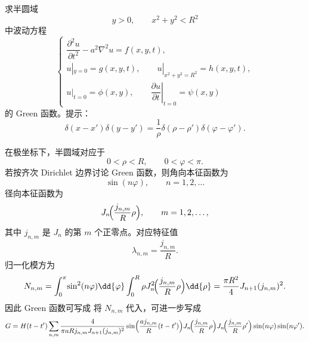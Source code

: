 \begin{question}

求半圆域
\[
 y>0,\qquad x^2+y^2<R^2
\]
中波动方程
\[
\begin{cases}
\dfrac{\partial^2u}{\partial t^2}-a^2\nabla^2u=f(x,y,t),\\
u|_{y=0}=g(x,y,t),\qquad u|_{x^2+y^2=R^2}=h(x,y,t),\\
u|_{t=0}=\phi(x,y),\qquad \left.\dfrac{\partial u}{\partial t}\right|_{t=0}=\psi(x,y)
\end{cases}
\]
的 Green 函数。提示：
\[
\delta(x-x')\delta(y-y')=\frac1\rho\delta(\rho-\rho')\delta(\varphi-\varphi').
\]

\begin{solution}

在极坐标下，半圆域对应于
\[
 0<\rho<R,\qquad 0<\varphi<\pi.
\]
若按齐次 Dirichlet 边界讨论 Green 函数，则角向本征函数为
\[
 \sin(n\varphi),\qquad n=1,2,\dots
\]
径向本征函数为
\[
 J_n\!\Bigl(\frac{j_{n,m}}{R}\rho\Bigr),
\qquad m=1,2,\dots,
\]
其中 $j_{n,m}$ 是 $J_n$ 的第 $m$ 个正零点。对应特征值
\[
 \lambda_{n,m}=\frac{j_{n,m}}{R}.
\]
归一化模方为
\[
N_{n,m}=
\int_0^{\pi}\!\sin^2(n\varphi)\dd{\varphi}
\int_0^R \rho J_n^2\!\Bigl(\frac{j_{n,m}}{R}\rho\Bigr)\dd{\rho}
=\frac{\pi R^2}{4}J_{n+1}(j_{n,m})^2.
\]
因此 Green 函数可写成
将 $N_{n,m}$ 代入，可进一步写成
\[
G=H(t-t')\sum_{n,m}
\frac{4}{\pi a R j_{n,m}J_{n+1}(j_{n,m})^2}
\sin\Bigl(\frac{a j_{n,m}}{R}(t-t')\Bigr)
J_n\!\Bigl(\frac{j_{n,m}}{R}\rho\Bigr)
J_n\!\Bigl(\frac{j_{n,m}}{R}\rho'\Bigr)
\sin(n\varphi)\sin(n\varphi').
\]

\end{solution}
\end{question}

